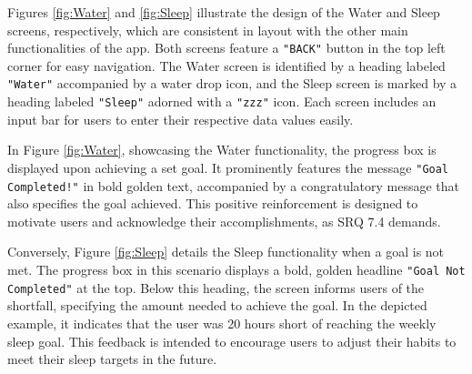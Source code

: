 \documentclass[11pt]{article}
\begin{document}
Figures \ref{fig:Water} and \ref{fig:Sleep} illustrate the design of the Water and Sleep screens,
respectively, which are consistent in layout with the other main functionalities of the app. 
Both screens feature a \texttt{"BACK"} button in the top left corner for easy navigation. The Water 
screen is identified by a heading labeled \texttt{"Water"} accompanied by a water drop icon, and the
Sleep screen is marked by a heading labeled \texttt{"Sleep"} adorned with a \texttt{"zzz"} icon. Each screen 
includes an input bar for users to enter their respective data values easily.\par

In Figure \ref{fig:Water}, showcasing the Water functionality, the progress box is displayed
upon achieving a set goal. It prominently features the message \texttt{"Goal Completed!"} in bold 
golden text, accompanied by a congratulatory message that also specifies the goal achieved.
This positive reinforcement is designed to motivate users and acknowledge their accomplishments, as SRQ 7.4 demands.\par

Conversely, Figure \ref{fig:Sleep} details the Sleep functionality when a goal is not met.
The progress box in this scenario displays a bold, golden headline \texttt{"Goal Not Completed"} at
the top. Below this heading, the screen informs users of the shortfall, specifying the 
amount needed to achieve the goal. In the depicted example, it indicates that the user 
was 20 hours short of reaching the weekly sleep goal. This feedback is intended to 
encourage users to adjust their habits to meet their sleep targets in the future.\par
\end{document}
